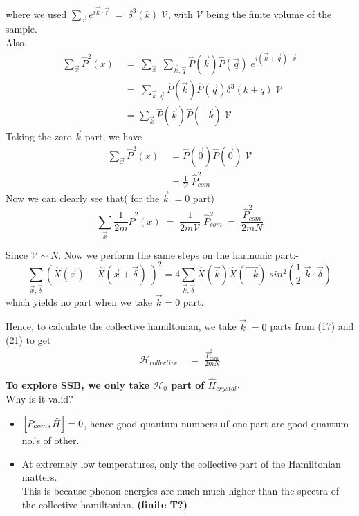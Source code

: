 \documentclass[12pt]{article}
\begin{document}
where we used $\sum_{\Vec{r}}e^{i\Vec{k}\cdot\Vec{r}}\;=\;\delta^3(k)\;\mathcal{V}$, with $\mathcal{V}$ being the finite volume of the sample.\\
Also, 
\begin{align}
    \sum_{\Vec{x}} \hat{P}^2(x)\;&=\;\sum_{\Vec{x}}\;\sum_{\Vec{k},\Vec{q}} \hat{P}(\Vec{k})\hat{P}(\Vec{q})\;e^{i(\Vec{k}+\Vec{q})\cdot \Vec{x}}\\
    &=\;\sum_{\Vec{k},\Vec{q}}\hat{P}(\Vec{k})\hat{P}(\Vec{q}) \delta^3(k+q)\;\mathcal{V}\\
    &= \sum_{\Vec{k}} \hat{P}(\Vec{k}) \hat{P}(\Vec{-k}) \;\mathcal{V}
\end{align}
Taking the zero $\Vec{k}$ part, we have 
\begin{align}
     \sum_{\Vec{x}} \hat{P}^2(x)\;&= \hat{P}(\Vec{0}) \hat{P}(\Vec{0})\;\mathcal{V}\\
     &= \frac{1}{\mathcal{V}}\;\hat{P}^2_{com}
\end{align}
Now we can clearly see that( for the $\vec{k}\;=0$ part)
\begin{equation}
    \sum_{\Vec{x}} \frac{1}{2m}\hat{P}^2(x)\;=\;\frac{1}{2m\mathcal{V}}\;\hat{P}^2_{com}\;=\;\frac{\hat{P}^2_{com}}{2mN}
\end{equation}


Since $\mathcal{V} \sim N$. Now we perform the same steps on the harmonic part:-
\begin{equation}
    \sum_{\vec{x},\vec{\delta}} (\hat{X}(\vec{x})-\hat{X}(\vec{x}+\vec{\delta})\;)^2 = 4 \sum_{\vec{k}, \vec{\delta}} \hat{X}(\vec{k})\hat{X}(\vec{-k})\; sin^2(\frac{1}{2}\;\vec{k}\cdot\vec{\delta}) 
\end{equation}
 which yields no part when we take $\vec{k}=0$ part.
 
Hence, to calculate the collective hamiltonian, we take $\vec{k}\;=0$ parts from (17) and (21) to get 
\begin{align}
    \mathcal{H}_{collective}\;&=\;\frac{\hat{P}^2_{com}}{2mN}
\end{align}


\textbf{To explore SSB, we only take $\mathcal{H}_0$ part of $\hat{H}_{crystal}$}.\\
\newline
Why is it valid?
\begin{itemize}
    \item $\comm{P_{com}}{\hat{H}}=0$, hence good quantum numbers \textbf{of} one part are good quantum no.'s of other.
    \item At extremely low temperatures, only the collective part of the Hamiltonian matters.\\
        This is because phonon energies are much-much higher than the spectra of the collective hamiltonian. \textbf{(finite T?)}
\end{itemize}
\newpage
\end{document}
